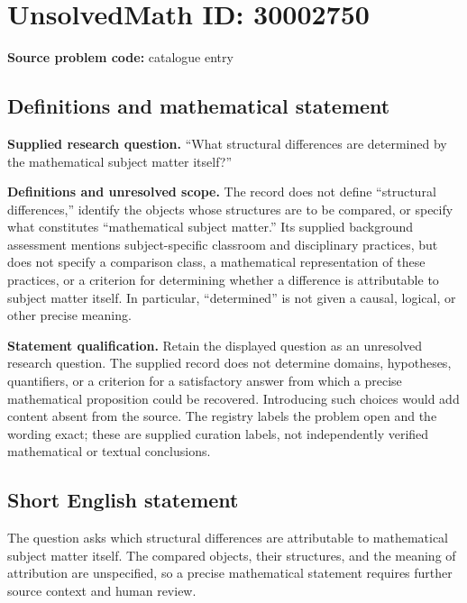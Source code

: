 \documentclass[11pt]{article}
\begin{document}
\section*{UnsolvedMath ID: 30002750}
\textbf{Source problem code:} catalogue entry
\subsection{Definitions and mathematical statement}
\textbf{Supplied research question.} ``What structural differences are determined by the mathematical subject matter itself?''

\textbf{Definitions and unresolved scope.} The record does not define ``structural differences,'' identify the objects whose structures are to be compared, or specify what constitutes ``mathematical subject matter.'' Its supplied background assessment mentions subject-specific classroom and disciplinary practices, but does not specify a comparison class, a mathematical representation of these practices, or a criterion for determining whether a difference is attributable to subject matter itself. In particular, ``determined'' is not given a causal, logical, or other precise meaning.

\textbf{Statement qualification.} Retain the displayed question as an unresolved research question. The supplied record does not determine domains, hypotheses, quantifiers, or a criterion for a satisfactory answer from which a precise mathematical proposition could be recovered. Introducing such choices would add content absent from the source. The registry labels the problem open and the wording exact; these are supplied curation labels, not independently verified mathematical or textual conclusions.
\subsection{Short English statement}
The question asks which structural differences are attributable to mathematical subject matter itself. The compared objects, their structures, and the meaning of attribution are unspecified, so a precise mathematical statement requires further source context and human review.
\end{document}
